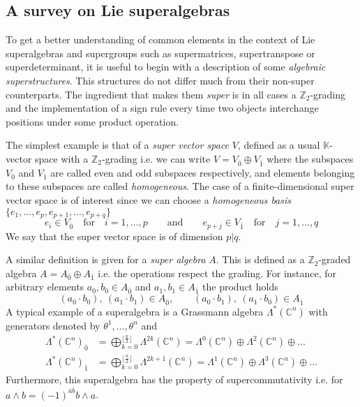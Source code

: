 \documentclass[a4paper,12pt]{article}
\numberwithin{equation}{section}
\numberwithin{thm}{section}
\numberwithin{exm}{section}
\newcommand{\Z}{{\mathbb Z}}
\newcommand{\C}{{\mathbb C}}
\newcommand{\we}{{\wedge}}
\newcommand{\<}{{\langle}}
\renewcommand{\>}{{\rangle}}
\renewcommand{\L}{{\Lambda}}
\renewcommand{\t}{{\theta}}
\begin{document}
\subsection{A survey on Lie superalgebras}
To get a better understanding of common elements in the context of Lie superalgebras and supergroups such as supermatrices, supertranspose or superdeterminant, it is useful to begin with a description of some {\it algebraic superstructures}. This structures do not differ much from their non-super counterparts. The ingredient that makes them {\it super} is in all cases a $\Z_2$-grading and the implementation of a sign rule every time two objects interchange positions under some product operation.

The simplest example is that of a {\it super vector space} $V$, defined as a usual $\mathbb{K}$-vector space with a $\Z_2$-grading i.e. we can write $V = V_{\bar 0} \oplus V_{\bar 1}$ where the subspaces $V_{\bar 0}$ and $V_{\bar 1}$ are called even and odd subspaces respectively, and elements belonging to these subspaces are called {\it homogeneous}. The case of a finite-dimensional super vector space is of interest since we can choose a {\it homogeneous basis} $\{e_1, \ldots, e_p, e_{p+1}, \ldots, e_{p+q}\}$
	\begin{equation}
	e_i \in V_{\bar 0}\quad\text{for}\quad i=1,\ldots,p\qquad\text{and}\qquad e_{p+j} \in V_{\bar 1}\quad\text{for}\quad j=1,\ldots,q
	\end{equation}
We say that the super vector space is of dimension $p|q$.

A similar definition is given for a {\it super algebra} $A$. This is defined as a $\Z_2$-graded algebra $A = A_{\bar 0} \oplus A_{\bar 1}$ i.e. the operations respect the grading. For instance, for arbitrary elements $a_0, b_0 \in A_{\bar 0}$ and $a_1, b_1 \in A_{\bar 1}$ the product holds
	\begin{equation}
	(a_0 \cdot b_0),\ (a_1\cdot b_1) \in A_{\bar 0},\qquad (a_0\cdot b_1),\ (a_1\cdot b_0) \in A_{\bar 1}
	\end{equation}
A typical example of a superalgebra is a Grassmann algebra $\L^*(\C^{n})$ with generators denoted by $\t^1,\ldots, \t^n$ and
	\begin{align}
	\L^*(\C^n)_{\bar 0} & = \bigoplus_{k=0}^{\lfloor\frac{n}{2}\rfloor}\L^{2k}(\C^n) = \L^0(\C^n)\oplus\L^2(\C^n)\oplus\ldots \\
	\L^*(\C^n)_{\bar 1} & = \bigoplus_{k=0}^{\lfloor\frac{n}{2}\rfloor}\L^{2k+1}(\C^n) = \L^1(\C^n)\oplus\L^3(\C^n)\oplus\ldots
	\end{align}
Furthermore, this superalgebra has the property of supercommutativity i.e. for $a\we b = (-1)^{\bar a \bar b} b\we a$.
\end{document}
